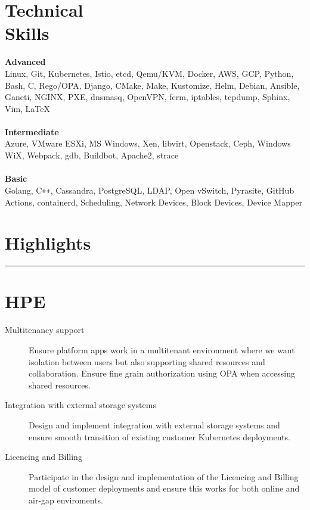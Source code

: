 \documentclass[margin,centered]{res}
\begin{document}
\begin{resume}
\section{\sc Technical\\Skills}
  \textbf{Advanced}\\
  Linux, Git, Kubernetes, Istio, etcd, Qemu/KVM, Docker, AWS, GCP, Python,
  Bash, C, Rego/OPA, Django, CMake, Make, Kustomize, Helm, Debian, Ansible, Ganeti, NGINX,
  PXE, dnsmasq, OpenVPN, ferm, iptables, tcpdump, Sphinx, Vim, \LaTeX\\\\
  \textbf{Intermediate}\\
  Azure, VMware ESXi, MS Windows, Xen, libvirt, Openstack, Ceph, Windows WiX,
  Webpack, gdb, Buildbot, Apache2, strace\\\\
  \textbf{Basic}\\
  Golang, C\texttt{++}, Cassandra, PostgreSQL, LDAP, Open vSwitch, Pyrasite,
  GitHub Actions, containerd, Scheduling, Network Devices, Block Devices,
  Device Mapper

\pagebreak
\section{Highlights}
\rule[3pt]{\textwidth}{0.4pt}

\section{\sc HPE}

\begin{description}
\item[Multitenancy support]
Ensure platform apps work in a multitenant environment where we want isolation
between users but also supporting shared resources and collaboration. Ensure fine
grain authorization using OPA when accessing shared resources.
\end{description}

\begin{description}
\item[Integration with external storage systems]
Design and implement integration with external storage systems and ensure smooth
transition of existing customer Kubernetes deployments.
\end{description}

\begin{description}
\item[Licencing and Billing]
Participate in the design and implementation of the Licencing and Billing model
of customer deployments and ensure this works for both online and air-gap enviroments.
\end{description}


\end{resume}
\end{document}
